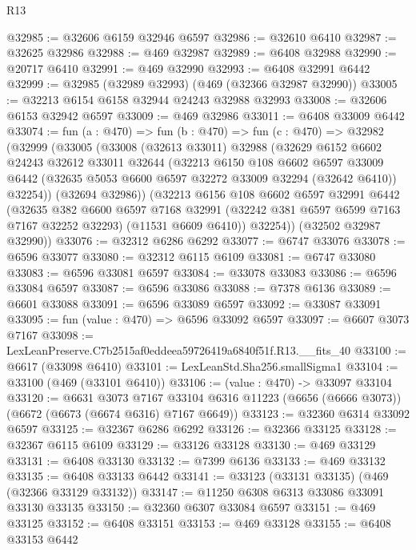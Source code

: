\begin{lexlean}{R13}
\begin{coremodule}
@32985 := @32606 @6159 @32946 @6597
@32986 := @32610 @6410
@32987 := @32625 @32986
@32988 := @469 @32987
@32989 := @6408 @32988
@32990 := @20717 @6410
@32991 := @469 @32990
@32993 := @6408 @32991 @6442
@32999 := @32985 (@32989 @32993) (@469 (@32366 @32987 @32990))
@33005 := @32213 @6154 @6158 @32944 @24243 @32988 @32993
@33008 := @32606 @6153 @32942 @6597
@33009 := @469 @32986
@33011 := @6408 @33009 @6442
@33074 := fun (a : @470) =>
  fun (b : @470) =>
  fun (c : @470) =>
  @32982
    (@32999
      (@33005
        (@33008
          (@32613 @33011)
          @32988
          (@32629
            @6152
            @6602
            @24243
            @32612
            @33011
            @32644
            (@32213
              @6150
              @108
              @6602
              @6597
              @33009
              @6442
              (@32635 @5053 @6600 @6597 @32272 @33009 @32294 (@32642 @6410))
              @32254))
          (@32694 @32986))
        (@32213
          @6156
          @108
          @6602
          @6597
          @32991
          @6442
          (@32635
            @382
            @6600
            @6597
            @7168
            @32991
            (@32242 @381 @6597 @6599 @7163 @7167 @32252 @32293)
            (@11531 @6609 @6410))
          @32254))
      (@32502 @32987 @32990))
@33076 := @32312 @6286 @6292
@33077 := @6747 @33076
@33078 := @6596 @33077
@33080 := @32312 @6115 @6109
@33081 := @6747 @33080
@33083 := @6596 @33081 @6597
@33084 := @33078 @33083
@33086 := @6596 @33084 @6597
@33087 := @6596 @33086
@33088 := @7378 @6136
@33089 := @6601 @33088
@33091 := @6596 @33089 @6597
@33092 := @33087 @33091
@33095 := fun (value : @470) => @6596 @33092 @6597
@33097 := @6607 @3073 @7167
@33098 := LexLeanPreserve.C7b2515af0eddeea59726419a6840f51f.R13.__fits_40
@33100 := @6617 (@33098 @6410)
@33101 := LexLeanStd.Sha256.smallSigma1
@33104 := @33100 (@469 (@33101 @6410))
@33106 := (value : @470) -> @33097 @33104
@33120 := @6631
    @3073
    @7167
    @33104
    @6316
    @11223
    (@6656 (@6666 @3073))
    (@6672 (@6673 (@6674 @6316) @7167 @6649))
@33123 := @32360 @6314 @33092 @6597
@33125 := @32367 @6286 @6292
@33126 := @32366 @33125
@33128 := @32367 @6115 @6109
@33129 := @33126 @33128
@33130 := @469 @33129
@33131 := @6408 @33130
@33132 := @7399 @6136
@33133 := @469 @33132
@33135 := @6408 @33133 @6442
@33141 := @33123 (@33131 @33135) (@469 (@32366 @33129 @33132))
@33147 := @11250 @6308 @6313 @33086 @33091 @33130 @33135
@33150 := @32360 @6307 @33084 @6597
@33151 := @469 @33125
@33152 := @6408 @33151
@33153 := @469 @33128
@33155 := @6408 @33153 @6442

\end{coremodule}
\end{lexlean}
